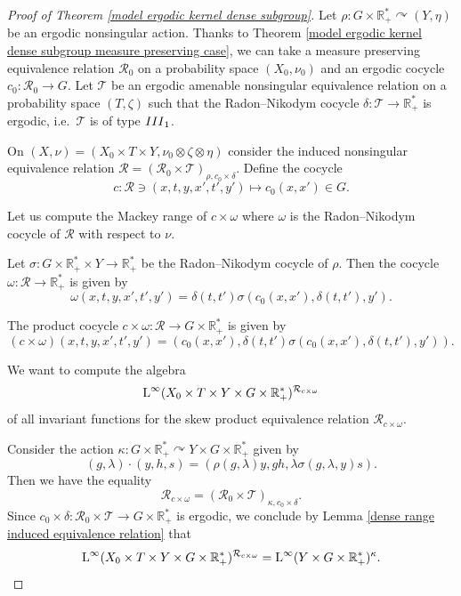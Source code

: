 \documentclass[10pt,a4paper]{amsart}
\newcommand{\III}{{\rm III}}
\newcommand{\R}{\mathbb{R}}
\newcommand{\cR}{\mathcal{R}}
\newcommand{\cT}{\mathcal{T}}
\newcommand{\rL}{\mathord{\text{\rm L}}}
\begin{document}
\begin{proof}[Proof of Theorem \ref{model ergodic kernel dense subgroup}]
    Let $\rho : G \times \R^*_+ \curvearrowright (Y,\eta)$ be an ergodic nonsingular action. Thanks to Theorem \ref{model ergodic kernel dense subgroup measure preserving case}, we can take a measure preserving equivalence relation $\cR_0$ on a probability space $(X_0,\nu_0)$ and an ergodic cocycle $c_0 : \cR_0 \rightarrow G$. Let $\cT$ be an ergodic amenable nonsingular equivalence relation on a probability space $(T,\zeta)$ such that the Radon--Nikodym cocycle $\delta : \cT \rightarrow \R^*_+$ is ergodic, i.e.\ $\cT$ is of type $\III_1$. 
    
    On $(X,\nu)=(X_0 \times T \times Y, \nu_0 \otimes \zeta \otimes \eta)$ consider the induced nonsingular equivalence relation $\cR=(\cR_0 \times \cT)_{\rho,c_0 \times \delta}$. Define the cocycle 
    $$c : \cR \ni (x,t,y,x',t',y') \mapsto c_0(x,x') \in G.$$

    Let us compute the Mackey range of $c \times \omega$ where $\omega$ is the Radon--Nikodym cocycle of $\cR$ with respect to $\nu$.
    
     Let $\sigma : G \times \R^*_+ \times Y \rightarrow \R^*_+$ be the Radon--Nikodym cocycle of $\rho$. Then the cocycle $\omega : \cR \rightarrow \R^*_+$ is given by  $$ \omega(x,t,y,x',t',y') = \delta(t,t') \sigma(c_0(x,x'),\delta(t,t'),y').$$
     

    The product cocycle $c \times \omega : \cR \rightarrow G \times \R^*_+$ is given by
    $$ (c \times \omega)(x,t,y,x',t',y') =\left( c_0(x,x'), \delta(t,t') \sigma(c_0(x,x'),\delta(t,t'),y') \right).$$

     
     
    We want to compute the algebra $$\rL^\infty(X_0 \times T \times Y \times G \times \R^*_+)^{\cR_{c \times \omega}}$$ of all invariant functions for the skew product equivalence relation $\cR_{c \times \omega}$. 
    
    Consider the action $\kappa :  G \times \R^*_+ \curvearrowright Y \times G \times \R^*_+$ given by $$(g,\lambda) \cdot (y,h,s) = (\rho(g,\lambda) y, g h, \lambda \sigma(g,\lambda,y) s).$$
    Then we have the equality $$\cR_{c \times \omega} = (\cR_0 \times \cT)_{\kappa,c_0 \times \delta}.$$ 
    Since $c_0 \times \delta : \cR_0 \times \cT \rightarrow G \times \R^*_+$ is ergodic, we conclude by Lemma \ref{dense range induced equivalence relation} that $$\rL^\infty(X_0 \times T \times Y \times G \times \R^*_+)^{\cR_{c \times \omega}}=\rL^\infty(Y \times G \times \R^*_+)^{\kappa}.$$


\end{proof}
\end{document}
